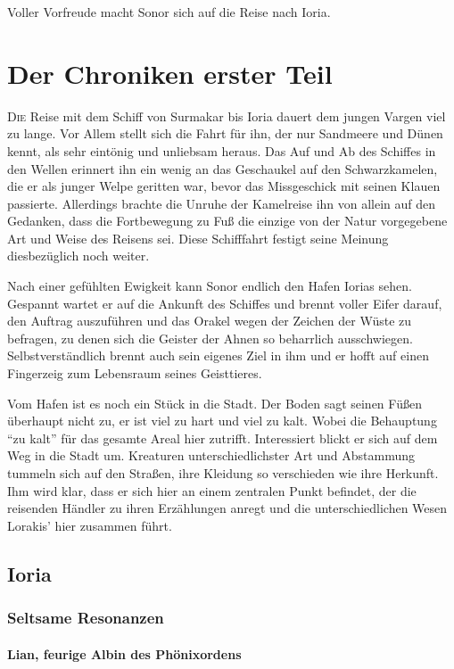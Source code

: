\documentclass[a4paper]{scrreprt}
\def\capitalsfont{\usefont{U}{AnnSton}{xl}{n}\selectfont}
\newcommand{\capital}[2]{\lettrine[lines=8]{\capitalsfont #1}{#2}}
\begin{document}
Voller Vorfreude macht Sonor sich auf die Reise nach Ioria.


\part{Der Chroniken erster Teil}
\capital{D}{ie} Reise mit dem Schiff von Surmakar bis Ioria dauert dem jungen Vargen viel zu lange. 
Vor Allem stellt sich die Fahrt für ihn, der nur Sandmeere und Dünen kennt, als sehr eintönig und unliebsam heraus.
Das Auf und Ab des Schiffes in den Wellen erinnert ihn ein wenig an das Geschaukel auf den Schwarzkamelen, die er als junger Welpe geritten war, bevor das Missgeschick mit seinen Klauen passierte.
Allerdings brachte die Unruhe der Kamelreise ihn von allein auf den Gedanken, dass die Fortbewegung zu Fuß die einzige von der Natur vorgegebene Art und Weise des Reisens sei.
Diese Schifffahrt festigt seine Meinung diesbezüglich noch weiter.
 
Nach einer gefühlten Ewigkeit kann Sonor endlich den Hafen Iorias sehen.
Gespannt wartet er auf die Ankunft des Schiffes und brennt voller Eifer darauf, den Auftrag auszuführen und das Orakel wegen der Zeichen der Wüste zu befragen, zu denen sich die Geister der Ahnen so beharrlich ausschwiegen. Selbstverständlich brennt auch sein eigenes Ziel in ihm und er hofft auf einen Fingerzeig zum Lebensraum seines Geisttieres.

Vom Hafen ist es noch ein Stück in die Stadt. Der Boden sagt seinen Füßen überhaupt nicht zu, er ist viel zu hart und viel zu kalt. 
Wobei die Behauptung \enquote{zu kalt} für das gesamte Areal hier zutrifft.
Interessiert blickt er sich auf dem Weg in die Stadt um. Kreaturen unterschiedlichster Art und Abstammung tummeln sich auf den Straßen, ihre Kleidung so verschieden wie ihre Herkunft. Ihm wird klar, dass er sich hier an einem zentralen Punkt befindet, der die reisenden Händler zu ihren Erzählungen anregt und die unterschiedlichen Wesen Lorakis' hier zusammen führt. 

\chapter[Datum erstes Spiel]{Ioria}

\section{Seltsame Resonanzen}
\subsection{Lian, feurige Albin des Phönixordens}
\end{document}
